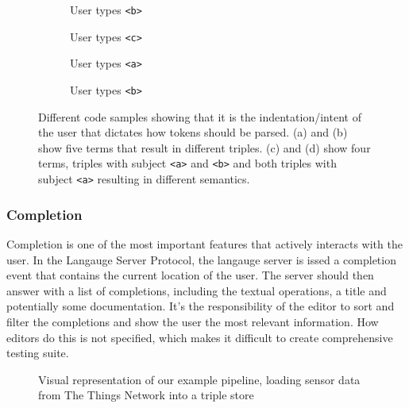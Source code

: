 \begin{figure}[tb]
    \centering
    \begin{subfigure}{0.21\textwidth}
      
      \caption{User types \texttt{<b>}}
      \label{code1}
    \end{subfigure}
    \hfill
    \begin{subfigure}{0.21\textwidth}
      
      \caption{User types \texttt{<c>}}
      \label{code2}
    \end{subfigure}
    \hfill
    \begin{subfigure}{0.21\textwidth}
      
      \caption{User types \texttt{<a>}}
      \label{code3}
    \end{subfigure}
    \hfill
    \begin{subfigure}{0.21\textwidth}
      
      \caption{User types \texttt{<b>}}
      \label{code4}
    \end{subfigure}
    \caption{Different code samples showing that it is the indentation/intent of the user that dictates how tokens should be parsed. (a) and (b) show five terms that result in different triples. (c) and (d) show four terms, triples with subject \texttt{<a>} and \texttt{<b>} and both triples with subject \texttt{<a>} resulting in different semantics.    }\label{lst:GroupedListing}
\end{figure}



\subsubsection{Completion}

Completion is one of the most important features that actively interacts with the user.
In the Langauge Server Protocol, the langauge server is issed a completion event that contains the current location of the user.
The server should then answer with a list of completions, including the textual operations, a title and potentially some documentation.
It's the responsibility of the editor to sort and filter the completions and show the user the most relevant information.
How editors do this is not specified, which makes it difficult to create comprehensive testing suite.

\begin{figure}[!ht]
 \centering
  \caption{Visual representation of our example pipeline, 
      loading sensor data from The Things Network into a triple store}\label{fig:Completion}
\end{figure}

